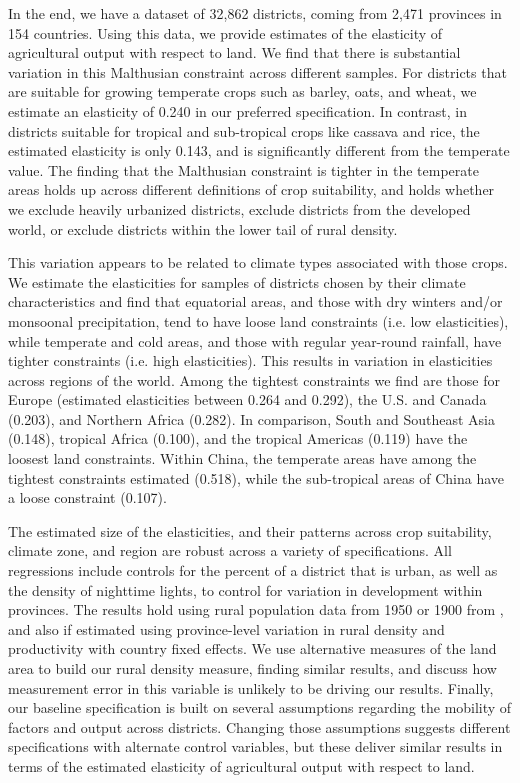 \documentclass[11pt]{article}
\begin{document}
In the end, we have a dataset of 32,862 districts, coming from 2,471 provinces in 154 countries. Using this data, we provide estimates of the elasticity of agricultural output with respect to land. We find that there is substantial variation in this Malthusian constraint across different samples. For districts that are suitable for growing temperate crops such as barley, oats, and wheat, we estimate an elasticity of 0.240 in our preferred specification. In contrast, in districts suitable for tropical and sub-tropical crops like cassava and rice, the estimated elasticity is only 0.143, and is significantly different from the temperate value. The finding that the Malthusian constraint is tighter in the temperate areas holds up across different definitions of crop suitability, and holds whether we exclude heavily urbanized districts, exclude districts from the developed world, or exclude districts within the lower tail of rural density. 

This variation appears to be related to climate types associated with those crops. We estimate the elasticities for samples of districts chosen by their climate characteristics and find that equatorial areas, and those with dry winters and/or monsoonal precipitation, tend to have loose land constraints (i.e. low elasticities), while temperate and cold areas, and those with regular year-round rainfall, have tighter constraints (i.e. high elasticities). This results in variation in elasticities across regions of the world. Among the tightest constraints we find are those for Europe (estimated elasticities between 0.264 and 0.292), the U.S. and Canada (0.203), and Northern Africa (0.282). In comparison, South and Southeast Asia (0.148), tropical Africa (0.100), and the tropical Americas (0.119) have the loosest land constraints. Within China, the temperate areas have among the tightest constraints estimated (0.518), while the sub-tropical areas of China have a loose constraint (0.107).

The estimated size of the elasticities, and their patterns across crop suitability, climate zone, and region are robust across a variety of specifications. All regressions include controls for the percent of a district that is urban, as well as the density of nighttime lights, to control for variation in development within provinces. The results hold using rural population data from 1950 or 1900 from \cite{hyde31}, and also if estimated using province-level variation in rural density and productivity with country fixed effects. We use alternative measures of the land area to build our rural density measure, finding similar results, and discuss how measurement error in this variable is unlikely to be driving our results. Finally, our baseline specification is built on several assumptions regarding the mobility of factors and output across districts. Changing those assumptions suggests different specifications with alternate control variables, but these deliver similar results in terms of the estimated elasticity of agricultural output with respect to land.
\end{document}
